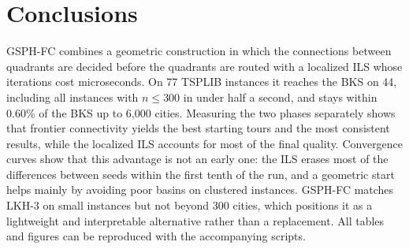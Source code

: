 \documentclass[runningheads]{llncs}
\begin{document}
\section{Conclusions}
\label{sec:conclusions}

GSPH-FC combines a geometric construction in which the connections
between quadrants are decided before the quadrants are routed with a
localized ILS whose iterations cost microseconds. On 77 TSPLIB instances
it reaches the BKS on 44, including all instances with $n\le 300$ in
under half a second, and stays within 0.60\% of the BKS up to 6{,}000
cities. Measuring the two phases separately shows that frontier
connectivity yields the best starting tours and the most consistent
results, while the localized ILS accounts for most of the final quality.
Convergence curves show that this advantage is not an early one: the
ILS erases most of the differences between seeds within the first tenth
of the run, and a geometric start helps mainly by avoiding poor basins
on clustered instances.
GSPH-FC matches LKH-3 on small instances but not beyond 300 cities,
which positions it as a lightweight and interpretable alternative rather
than a replacement. All tables and figures can be reproduced with the
accompanying scripts.

%



\end{document}
